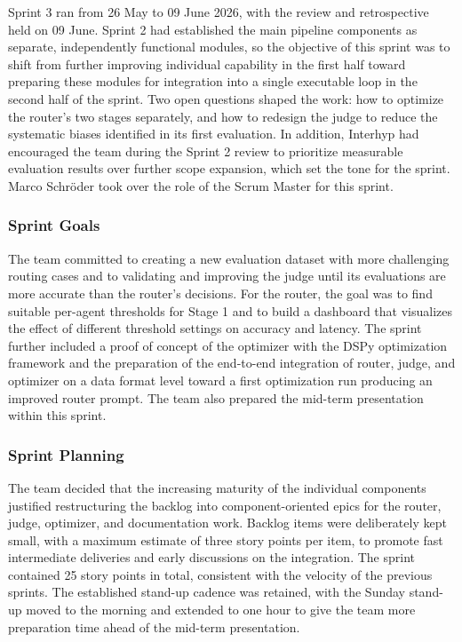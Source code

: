 \label{sec:sprint3}

Sprint 3 ran from 26 May to 09 June 2026, with the review and retrospective held on 09 June. Sprint 2 had established the main pipeline components as separate, independently functional modules, so the objective of this sprint was to shift from further improving individual capability in the first half toward preparing these modules for integration into a single executable loop in the second half of the sprint. Two open questions shaped the work: how to optimize the router's two stages separately, and how to redesign the judge to reduce the systematic biases identified in its first evaluation. In addition, Interhyp had encouraged the team during the Sprint 2 review to prioritize measurable evaluation results over further scope expansion, which set the tone for the sprint. Marco Schröder took over the role of the Scrum Master for this sprint.

\subsubsection{Sprint Goals}\label{sec:sprint3-goals}

The team committed to creating a new evaluation dataset with more challenging routing cases and to validating and improving the judge until its evaluations are more accurate than the router's decisions. For the router, the goal was to find suitable per-agent thresholds for Stage 1 and to build a dashboard that visualizes the effect of different threshold settings on accuracy and latency. The sprint further included a proof of concept of the optimizer with the DSPy optimization framework and the preparation of the end-to-end integration of router, judge, and optimizer on a data format level toward a first optimization run producing an improved router prompt. The team also prepared the mid-term presentation within this sprint.

\subsubsection{Sprint Planning}\label{sec:sprint3-planning}

The team decided that the increasing maturity of the individual components justified restructuring the backlog into component-oriented epics for the router, judge, optimizer, and documentation work. Backlog items were deliberately kept small, with a maximum estimate of three story points per item, to promote fast intermediate deliveries and early discussions on the integration. The sprint contained 25 story points in total, consistent with the velocity of the previous sprints. The established stand-up cadence was retained, with the Sunday stand-up moved to the morning and extended to one hour to give the team more preparation time ahead of the mid-term presentation.


